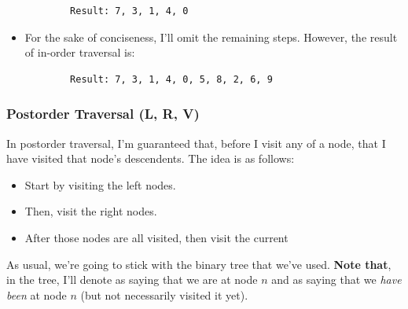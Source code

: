 \documentclass[letterpaper]{article}
\begin{document}
\begin{itemize}
\begin{verbatim}
        Result: 7, 3, 1, 4, 0
    \end{verbatim}

    \item For the sake of conciseness, I'll omit the remaining steps. However, the result of in-order traversal is: 
    \begin{verbatim}
        Result: 7, 3, 1, 4, 0, 5, 8, 2, 6, 9
    \end{verbatim}
\end{itemize}

\subsubsection{Postorder Traversal (L, R, V)}
In postorder traversal, I'm guaranteed that, before I visit any of a node, that I have visited that node's descendents. The idea is as follows:
\begin{itemize}
    \item Start by visiting the left nodes. 
    \item Then, visit the right nodes. 
    \item After those nodes are all visited, then visit the current
\end{itemize}

As usual, we're going to stick with the binary tree that we've used. \textbf{Note that}, in the tree, I'll denote \code{[n]} as saying that we are at node $n$ and  as saying that we \emph{have been} at node $n$ (but not necessarily visited it yet). 
\end{document}
